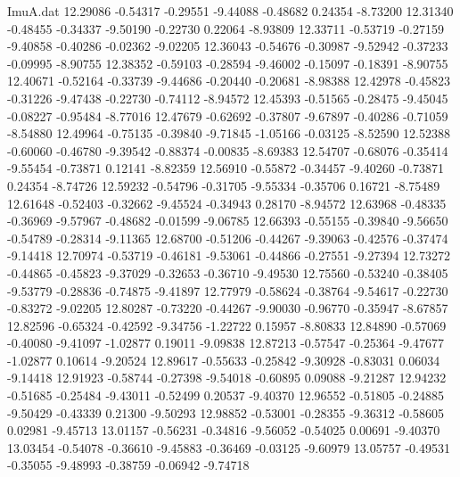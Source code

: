 \begin{filecontents}{ImuA.dat}
  12.29086   -0.54317   -0.29551   -9.44088   -0.48682    0.24354   -8.73200
  12.31340   -0.48455   -0.34337   -9.50190   -0.22730    0.22064   -8.93809
  12.33711   -0.53719   -0.27159   -9.40858   -0.40286   -0.02362   -9.02205
  12.36043   -0.54676   -0.30987   -9.52942   -0.37233   -0.09995   -8.90755
  12.38352   -0.59103   -0.28594   -9.46002   -0.15097   -0.18391   -8.90755
  12.40671   -0.52164   -0.33739   -9.44686   -0.20440   -0.20681   -8.98388
  12.42978   -0.45823   -0.31226   -9.47438   -0.22730   -0.74112   -8.94572
  12.45393   -0.51565   -0.28475   -9.45045   -0.08227   -0.95484   -8.77016
  12.47679   -0.62692   -0.37807   -9.67897   -0.40286   -0.71059   -8.54880
  12.49964   -0.75135   -0.39840   -9.71845   -1.05166   -0.03125   -8.52590
  12.52388   -0.60060   -0.46780   -9.39542   -0.88374   -0.00835   -8.69383
  12.54707   -0.68076   -0.35414   -9.55454   -0.73871    0.12141   -8.82359
  12.56910   -0.55872   -0.34457   -9.40260   -0.73871    0.24354   -8.74726
  12.59232   -0.54796   -0.31705   -9.55334   -0.35706    0.16721   -8.75489
  12.61648   -0.52403   -0.32662   -9.45524   -0.34943    0.28170   -8.94572
  12.63968   -0.48335   -0.36969   -9.57967   -0.48682   -0.01599   -9.06785
  12.66393   -0.55155   -0.39840   -9.56650   -0.54789   -0.28314   -9.11365
  12.68700   -0.51206   -0.44267   -9.39063   -0.42576   -0.37474   -9.14418
  12.70974   -0.53719   -0.46181   -9.53061   -0.44866   -0.27551   -9.27394
  12.73272   -0.44865   -0.45823   -9.37029   -0.32653   -0.36710   -9.49530
  12.75560   -0.53240   -0.38405   -9.53779   -0.28836   -0.74875   -9.41897
  12.77979   -0.58624   -0.38764   -9.54617   -0.22730   -0.83272   -9.02205
  12.80287   -0.73220   -0.44267   -9.90030   -0.96770   -0.35947   -8.67857
  12.82596   -0.65324   -0.42592   -9.34756   -1.22722    0.15957   -8.80833
  12.84890   -0.57069   -0.40080   -9.41097   -1.02877    0.19011   -9.09838
  12.87213   -0.57547   -0.25364   -9.47677   -1.02877    0.10614   -9.20524
  12.89617   -0.55633   -0.25842   -9.30928   -0.83031    0.06034   -9.14418
  12.91923   -0.58744   -0.27398   -9.54018   -0.60895    0.09088   -9.21287
  12.94232   -0.51685   -0.25484   -9.43011   -0.52499    0.20537   -9.40370
  12.96552   -0.51805   -0.24885   -9.50429   -0.43339    0.21300   -9.50293
  12.98852   -0.53001   -0.28355   -9.36312   -0.58605    0.02981   -9.45713
  13.01157   -0.56231   -0.34816   -9.56052   -0.54025    0.00691   -9.40370
  13.03454   -0.54078   -0.36610   -9.45883   -0.36469   -0.03125   -9.60979
  13.05757   -0.49531   -0.35055   -9.48993   -0.38759   -0.06942   -9.74718

\end{filecontents}
